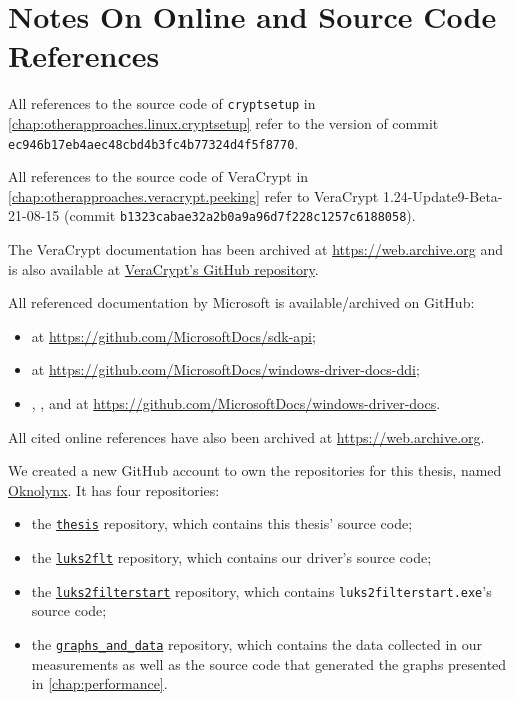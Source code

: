 \chapter{Notes On Online and Source Code References}
\label{app:onlinereferences}
All references to the source code of \texttt{cryptsetup} in \autoref{chap:otherapproaches.linux.cryptsetup} refer to the version of commit \texttt{ec946b17eb4aec48cbd4b3fc4b77324d4f5f8770}.

All references to the source code of VeraCrypt in \autoref{chap:otherapproaches.veracrypt.peeking} refer to VeraCrypt 1.24-Update9-Beta-21-08-15 (commit \texttt{b1323cabae32a2b0a9a96d7f228c1257c6188058}).

The VeraCrypt documentation \cite{Veracrypt} has been archived at \url{https://web.archive.org} and is also available at \href{https://github.com/veracrypt/VeraCrypt}{VeraCrypt's GitHub repository}.

All referenced documentation by Microsoft is available/archived on GitHub:
\begin{itemize}
	\item \cite{Win32} at \url{https://github.com/MicrosoftDocs/sdk-api};
	\item \cite{Wdk} at \url{https://github.com/MicrosoftDocs/windows-driver-docs-ddi};
	\item \cite{Wdf}, \cite{Fltmgr}, and \cite{Kerneldriver} at \url{https://github.com/MicrosoftDocs/windows-driver-docs}.
\end{itemize}

All cited online references have also been archived at \url{https://web.archive.org}.

We created a new GitHub account to own the repositories for this thesis, named \href{https://github.com/Oknolynx}{Oknolynx}. It has four repositories:
\begin{itemize}
	\item the \href{https://github.com/Oknolynx/thesis}{\texttt{thesis}} repository, which contains this thesis' source code;
	\item the \href{https://github.com/Oknolynx/luks2flt}{\texttt{luks2flt}} repository, which contains our driver's source code;
	\item the \href{https://github.com/Oknolynx/luks2filterstart}{\texttt{luks2filterstart}} repository, which contains \texttt{luks2filterstart.exe}'s source code;
	\item the \href{https://github.com/Oknolynx/graphs_and_data}{\texttt{graphs\_and\_data}} repository, which contains the data collected in our measurements as well as the source code that generated the graphs presented in \autoref{chap:performance}.
\end{itemize}